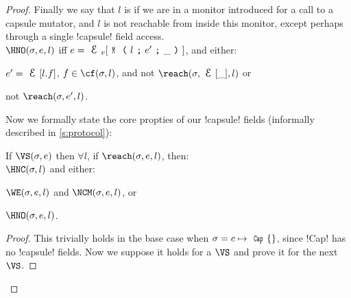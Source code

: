 \begin{Assumption}
\begin{Assumption}
\begin{Assumption}
\begin{proof}
\noindent Finally we say that $l$ is \HNO if we are in a monitor introduced for a call to a capsule mutator, and $l$ is not reachable from inside this monitor, except perhaps through a single \Q!capsule! field access.\\
\indent $\HNO(\s, e, l)$ iff $e = \EV[\M{l}{e'}{\_}]$, and either:
\begin{iitemize}
\item $e' = \E[l.f]$, $f \in \cf(\s, l)$, and not $\reach(\s, \E[\_], l)$ or
\item not $\reach(\s, e', l)$.
\end{iitemize}

\noindent Now we formally state the core propties of our \Q!capsule! fields (informally described in \ref{s:protocol}):%
\SS\begin{theorem}\rm
If $\VS(\s, e)$ then $\forall l$, if $\reach(\s, e, l)$, then:\\
\indent $\HNC(\s, l)$ and either:
\begin{iitemize}
\item $\WE(\s, e, l)$ and $\NCM(\s, e, l)$, or
\item $\HNO(\s, e, l)$.
\end{iitemize}
\end{theorem}\SS
\begin{proof}
This trivially holds in the base case when $\s = c\mapsto\Kw{Cap}\{\}$, since \Q!Cap! has no \Q!capsule! fields.
Now we suppose it holds for a $\VS$ and prove it for the next $\VS$.
 

\end{proof}
\end{proof}
\end{Assumption}
\end{Assumption}
\end{Assumption}
